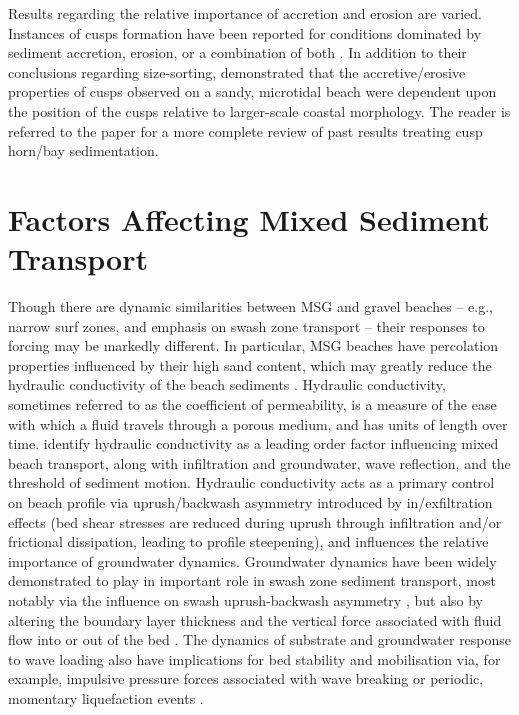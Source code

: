 Results regarding the relative importance of accretion and erosion are varied. Instances of cusps formation have been reported for conditions dominated by sediment accretion, erosion, or a combination of both \citep[e.g., ][]{Antia1987, Masselink1997, Almar_etal2008}. In addition to their conclusions regarding size-sorting, \citet{VanGaalen_etal2011} demonstrated that the accretive/erosive properties of cusps observed on a sandy, microtidal beach were dependent upon the position of the cusps relative to larger-scale coastal morphology. The reader is referred to the \citeauthor{VanGaalen_etal2011} paper for a more complete review of past results treating cusp horn/bay sedimentation.


\section{Factors Affecting Mixed Sediment Transport} \label{subsection:transport} 

Though there are dynamic similarities between MSG and gravel beaches -- e.g., narrow surf zones, and emphasis on swash zone transport -- their responses to forcing may be markedly different. In particular, MSG beaches have percolation properties influenced by their high sand content, which may greatly reduce the hydraulic conductivity of the beach sediments \citep{Carter_Orford1984}. Hydraulic conductivity, sometimes referred to as the coefficient of permeability, is a measure of the ease with which a fluid travels through a porous medium, and has units of length over time. \citet{Mason_Coates2001} identify hydraulic conductivity as a leading order factor influencing mixed beach transport, along with infiltration and groundwater, wave reflection, and the threshold of sediment motion. Hydraulic conductivity acts as a primary control on beach profile via uprush/backwash asymmetry introduced by in/exfiltration effects (bed shear stresses are reduced during uprush through infiltration and/or frictional dissipation, leading to profile steepening), and influences the relative importance of groundwater dynamics. Groundwater dynamics have been widely demonstrated to play in important role in swash zone sediment transport, most notably via the influence on swash uprush-backwash asymmetry \citep[e.g.][]{LonguetHiggins_Parkin1962, Packwood1983}, but also by altering the boundary layer thickness and the vertical force associated with fluid flow into or out of the bed \citep[see: seepage forces,][p. 101]{Nielsen1992}. The dynamics of substrate and groundwater response to wave loading also have implications for bed stability and mobilisation via, for example, impulsive pressure forces associated with wave breaking \citep{PedrozoAcuna_etal2008} or periodic, momentary liquefaction events \citep{Michallet_etal2009}.

